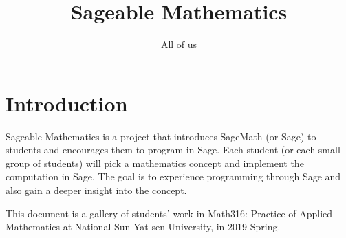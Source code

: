 \documentclass{article}
\title{Sageable Mathematics}
\author{All of us}
\begin{document}
\maketitle

\section{Introduction}
Sageable Mathematics is a project that introduces SageMath (or Sage) to students and encourages them to program in Sage.  Each student (or each small group of students) will pick a mathematics concept and implement the computation in Sage.  The goal is to experience programming through Sage and also gain a deeper insight into the concept.

This document is a gallery of students' work in Math316: Practice of Applied Mathematics at National Sun Yat-sen University, in 2019 Spring.


\end{document}
